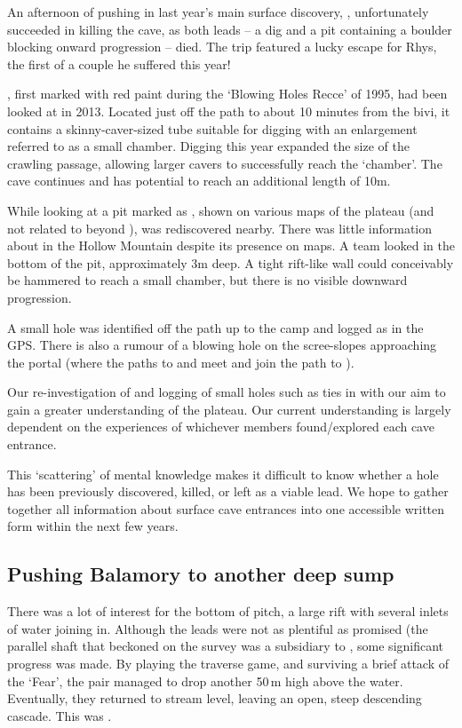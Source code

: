 An afternoon of pushing in last year's main surface discovery, , unfortunately succeeded in killing the cave, as both leads – a dig and a pit containing a boulder blocking onward progression – died. The trip featured a lucky escape for Rhys, the first of a couple he suffered this year!

, first marked with red paint during the `Blowing Holes Recce' of 1995, had been looked at in 2013. Located just off the path to  about 10 minutes from the bivi, it contains a skinny-caver-sized tube suitable for digging with an enlargement referred to as a small chamber. Digging this year expanded the size of the crawling passage, allowing larger cavers to successfully reach the `chamber'. The cave continues and  has potential to reach an additional length of 10m.

While looking at  a pit marked as , shown on various maps of the plateau (and not related to  beyond ), was rediscovered nearby. There was little information about  in the Hollow Mountain despite its presence on maps. A team looked in the bottom of the pit, approximately 3m deep. A tight rift-like wall could conceivably be hammered to reach a small chamber, but there is no visible downward progression. 

A small hole was identified off the path up to the camp and logged as  in the GPS. There is also a rumour of a blowing hole on the scree-slopes approaching the portal (where the paths to  and  meet and join the path to ).


Our re-investigation of  and logging of small holes such as  ties in with our aim to gain a greater understanding of the plateau. Our current understanding is largely dependent on the experiences of whichever members found/explored each cave entrance.

This `scattering' of mental knowledge makes it difficult to know whether a hole has been previously discovered, killed, or left as a viable lead. We hope to gather together all information about surface cave entrances into one accessible written form within the next few years.

 
\subsection{Pushing Balamory to another deep sump}
 There was a lot of interest for the bottom of  pitch, a large rift with several inlets of water joining in.  Although the leads were not as plentiful as promised (the parallel shaft that beckoned on the survey was a subsidiary to , some significant progress was made. By playing the traverse game, and surviving a brief attack of the `Fear', the pair managed to drop another 50\,m high above the water. Eventually, they returned to stream level, leaving an open, steep descending cascade. This was .

